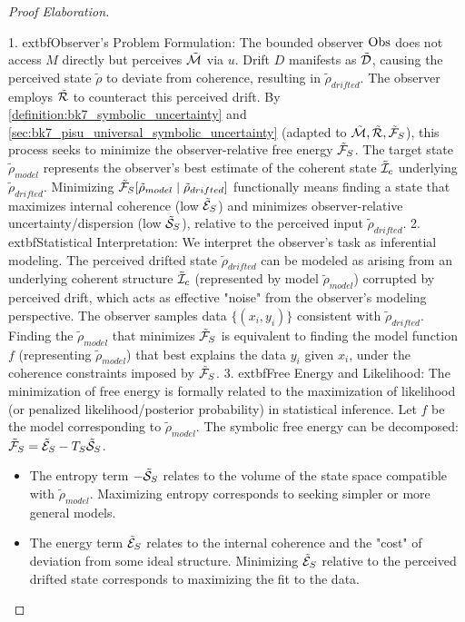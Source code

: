 \begin{proof}[Proof Elaboration]
\label{proof:bk7_proof_elaboration}
\leavevmode

1.  	extbf{Observer's Problem Formulation:} The bounded observer \( \mathrm{Obs} \) does not access \( M \) directly but perceives \( \tilde{\mathcal{M}} \) via \( u \). Drift \( D \) manifests as \( \tilde{\mathcal{D}} \), causing the perceived state \( \tilde{\rho} \) to deviate from coherence, resulting in \( \tilde{\rho}_{drifted} \). The observer employs \( \tilde{\mathcal{R}} \) to counteract this perceived drift. By \ref{definition:bk7_symbolic_uncertainty} and \ref{sec:bk7_pisu_universal_symbolic_uncertainty} (adapted to \( \tilde{\mathcal{M}}, \tilde{\mathcal{R}}, \tilde{\mathcal{F}}_S \)), this process seeks to minimize the observer-relative free energy \( \tilde{\mathcal{F}}_S \). The target state \( \tilde{\rho}_{model} \) represents the observer's best estimate of the coherent state \( \tilde{\mathcal{I}}_c \) underlying \( \tilde{\rho}_{drifted} \). Minimizing \( \tilde{\mathcal{F}}_S[ \tilde{\rho}_{model} \mid \tilde{\rho}_{drifted} ] \) functionally means finding a state that maximizes internal coherence (low \( \tilde{\mathcal{E}}_S \)) and minimizes observer-relative uncertainty/dispersion (low \( \tilde{\mathcal{S}}_S \)), relative to the perceived input \( \tilde{\rho}_{drifted} \).
2.  	extbf{Statistical Interpretation:} We interpret the observer's task as inferential modeling. The perceived drifted state \( \tilde{\rho}_{drifted} \) can be modeled as arising from an underlying coherent structure \( \tilde{\mathcal{I}}_c \) (represented by model \( \tilde{\rho}_{model} \)) corrupted by perceived drift, which acts as effective "noise" from the observer's modeling perspective. The observer samples data \( \{(x_i, y_i)\} \) consistent with \( \tilde{\rho}_{drifted} \). Finding the \( \tilde{\rho}_{model} \) that minimizes \( \tilde{\mathcal{F}}_S \) is equivalent to finding the model function \( f \) (representing \( \tilde{\rho}_{model} \)) that best explains the data \( y_i \) given \( x_i \), under the coherence constraints imposed by \( \tilde{\mathcal{F}}_S \).
3.  	extbf{Free Energy and Likelihood:} The minimization of free energy is formally related to the maximization of likelihood (or penalized likelihood/posterior probability) in statistical inference. Let \( f \) be the model corresponding to \( \tilde{\rho}_{model} \). The symbolic free energy can be decomposed: \( \tilde{\mathcal{F}}_S = \tilde{\mathcal{E}}_S - T_S \tilde{\mathcal{S}}_S \).
    \begin{itemize}
        \item The entropy term \( -\tilde{\mathcal{S}}_S \) relates to the volume of the state space compatible with \( \tilde{\rho}_{model} \). Maximizing entropy corresponds to seeking simpler or more general models.
        \item The energy term \( \tilde{\mathcal{E}}_S \) relates to the internal coherence and the "cost" of deviation from some ideal structure. Minimizing \( \tilde{\mathcal{E}}_S \) relative to the perceived drifted state corresponds to maximizing the fit to the data.

\end{itemize}
\end{proof}
